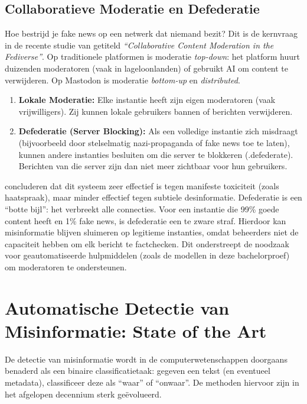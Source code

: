 \subsection{Collaboratieve Moderatie en Defederatie}
Hoe bestrijd je fake news op een netwerk dat niemand bezit? Dit is de kernvraag in de recente studie van \textcite{Zia2025} getiteld \textit{``Collaborative Content Moderation in the Fediverse''}.
Op traditionele platformen is moderatie \textit{top-down}: het platform huurt duizenden moderatoren (vaak in lageloonlanden) of gebruikt AI om content te verwijderen. Op Mastodon is moderatie \textit{bottom-up} en \textit{distributed}.
\begin{enumerate}
    \item \textbf{Lokale Moderatie:} Elke instantie heeft zijn eigen moderatoren (vaak vrijwilligers). Zij kunnen lokale gebruikers bannen of berichten verwijderen.
    \item \textbf{Defederatie (Server Blocking):} Als een volledige instantie zich misdraagt (bijvoorbeeld door stelselmatig nazi-propaganda of fake news toe te laten), kunnen andere instanties besluiten om die server te blokkeren (.defederate). Berichten van die server zijn dan niet meer zichtbaar voor hun gebruikers.
\end{enumerate}

\textcite{Zia2025} concluderen dat dit systeem zeer effectief is tegen manifeste toxiciteit (zoals haatspraak), maar minder effectief tegen subtiele desinformatie. Defederatie is een ``botte bijl'': het verbreekt alle connecties. Voor een instantie die 99\% goede content heeft en 1\% fake news, is defederatie een te zware straf. Hierdoor kan misinformatie blijven sluimeren op legitieme instanties, omdat beheerders niet de capaciteit hebben om elk bericht te factchecken. Dit onderstreept de noodzaak voor geautomatiseerde hulpmiddelen (zoals de modellen in deze bachelorproef) om moderatoren te ondersteunen.

\section{Automatische Detectie van Misinformatie: State of the Art}
\label{sec:detectie-methoden}

De detectie van misinformatie wordt in de computerwetenschappen doorgaans benaderd als een binaire classificatietaak: gegeven een tekst (en eventueel metadata), classificeer deze als ``waar'' of ``onwaar''. De methoden hiervoor zijn in het afgelopen decennium sterk geëvolueerd.

